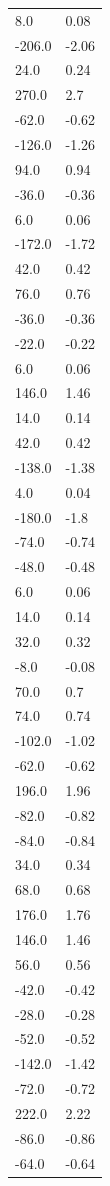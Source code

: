 \begin{longtable}{ll}
8.0 & 0.08 \\
-206.0 & -2.06 \\
24.0 & 0.24 \\
270.0 & 2.7 \\
-62.0 & -0.62 \\
-126.0 & -1.26 \\
94.0 & 0.94 \\
-36.0 & -0.36 \\
6.0 & 0.06 \\
-172.0 & -1.72 \\
42.0 & 0.42 \\
76.0 & 0.76 \\
-36.0 & -0.36 \\
-22.0 & -0.22 \\
6.0 & 0.06 \\
146.0 & 1.46 \\
14.0 & 0.14 \\
42.0 & 0.42 \\
-138.0 & -1.38 \\
4.0 & 0.04 \\
-180.0 & -1.8 \\
-74.0 & -0.74 \\
-48.0 & -0.48 \\
6.0 & 0.06 \\
14.0 & 0.14 \\
32.0 & 0.32 \\
-8.0 & -0.08 \\
70.0 & 0.7 \\
74.0 & 0.74 \\
-102.0 & -1.02 \\
-62.0 & -0.62 \\
196.0 & 1.96 \\
-82.0 & -0.82 \\
-84.0 & -0.84 \\
34.0 & 0.34 \\
68.0 & 0.68 \\
176.0 & 1.76 \\
146.0 & 1.46 \\
56.0 & 0.56 \\
-42.0 & -0.42 \\
-28.0 & -0.28 \\
-52.0 & -0.52 \\
-142.0 & -1.42 \\
-72.0 & -0.72 \\
222.0 & 2.22 \\
-86.0 & -0.86 \\
-64.0 & -0.64 \\

\end{longtable}
